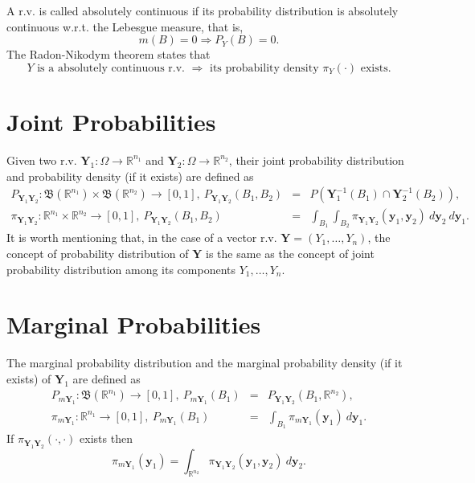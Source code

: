 A r.v. is called absolutely continuous if its probability distribution is absolutely continuous w.r.t. the Lebesgue measure, that is,
\begin{equation*}
m(B) = 0 \Rightarrow P_Y(B) = 0.
\end{equation*}
The Radon-Nikodym theorem \cite{KaSo05} states that
\begin{equation}\label{eq-radon-nik}
Y\text{ is a absolutely continuous r.v. }\Rightarrow\text{ its probability density }\pi_Y(\cdot)\text{ exists}.
\end{equation}

\section{Joint Probabilities}

Given two r.v. $\mathbf{Y}_1:\Omega\rightarrow\mathbb{R}^{n_1}$ and $\mathbf{Y}_2:\Omega\rightarrow\mathbb{R}^{n_2}$,
their joint probability distribution and probability density (if it exists) are defined as
\begin{eqnarray*}
P_{\mathbf{Y}_1\mathbf{Y}_2}:\mathfrak{B}(\mathbb{R}^{n_1})\times\mathfrak{B}(\mathbb{R}^{n_2})\rightarrow [0,1],~
P_{\mathbf{Y}_1\mathbf{Y}_2}(B_1,B_2)
& = &
P(\mathbf{Y}_1^{-1}(B_1)\cap\mathbf{Y}_2^{-1}(B_2)), \\
\pi_{\mathbf{Y}_1\mathbf{Y}_2}:\mathbb{R}^{n_1}\times\mathbb{R}^{n_2}\rightarrow [0,1],~
P_{\mathbf{Y}_1\mathbf{Y}_2}(B_1,B_2)
& = &
\int_{B_1}\int_{B_2}\pi_{\mathbf{Y}_1\mathbf{Y}_2}(\mathbf{y}_1,\mathbf{y}_2)~d\mathbf{y}_2~d\mathbf{y}_1.
\end{eqnarray*}
It is worth mentioning that, in the case of a vector r.v. $\mathbf{Y}=(Y_1,\ldots,Y_n)$,
the concept of probability distribution of $\mathbf{Y}$ is the same as
the concept of joint probability distribution among its components $Y_1,\ldots,Y_n$.

\section{Marginal Probabilities}

The marginal probability distribution and the marginal probability density (if it exists) of $\mathbf{Y}_1$ are defined as
\begin{eqnarray*}
P_{m\mathbf{Y}_1}:\mathfrak{B}(\mathbb{R}^{n_1})\rightarrow [0,1],~
P_{m\mathbf{Y}_1}(B_1)
& = &
P_{\mathbf{Y}_1\mathbf{Y}_2}(B_1,\mathbb{R}^{n_2}), \\
\pi_{m\mathbf{Y}_1}:\mathbb{R}^{n_1}\rightarrow [0,1],~
P_{m\mathbf{Y}_1}(B_1)
& = &
\int_{B_1}\pi_{m\mathbf{Y}_1}(\mathbf{y}_1)~d\mathbf{y}_1.
\end{eqnarray*}
%
If $\pi_{\mathbf{Y}_1\mathbf{Y}_2}(\cdot,\cdot)$ exists then
\begin{equation*}
\pi_{m\mathbf{Y}_1}(\mathbf{y}_1)
=
\int_{\mathbb{R}^{n_2}}\pi_{\mathbf{Y}_1\mathbf{Y}_2}(\mathbf{y}_1,\mathbf{y}_2)~d\mathbf{y}_2.
\end{equation*}


